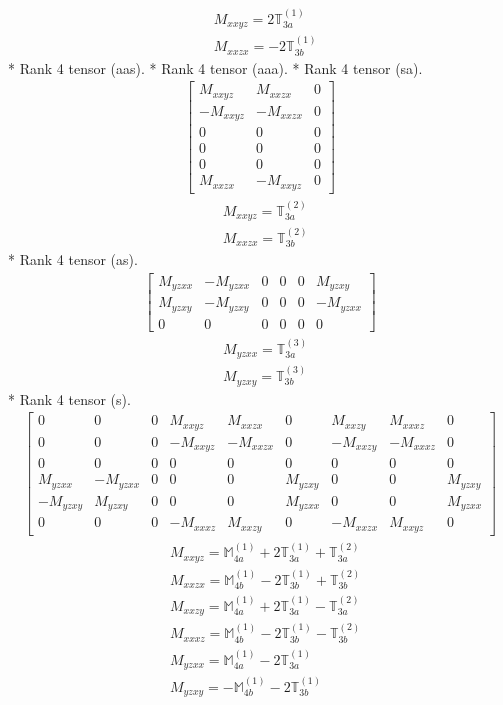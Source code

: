 \documentclass[fleqn,8pt,landscape]{jsarticle}
\begin{document}
\begin{align*}
& M_{xxyz} = 2 \mathbb{T}_{3a}^{(1)} \\
& M_{xxzx} = - 2 \mathbb{T}_{3b}^{(1)}
\end{align*}
* Rank 4 tensor (aas).
* Rank 4 tensor (aaa).
* Rank 4 tensor (sa).
\begin{align*}
\begin{bmatrix} M_{xxyz} & M_{xxzx} & 0 \\ - M_{xxyz} & - M_{xxzx} & 0 \\ 0 & 0 & 0 \\ 0 & 0 & 0 \\ 0 & 0 & 0 \\ M_{xxzx} & - M_{xxyz} & 0 \end{bmatrix}
\end{align*}
\begin{align*}
& M_{xxyz} = \mathbb{T}_{3a}^{(2)} \\
& M_{xxzx} = \mathbb{T}_{3b}^{(2)}
\end{align*}
* Rank 4 tensor (as).
\begin{align*}
\begin{bmatrix} M_{yzxx} & - M_{yzxx} & 0 & 0 & 0 & M_{yzxy} \\ M_{yzxy} & - M_{yzxy} & 0 & 0 & 0 & - M_{yzxx} \\ 0 & 0 & 0 & 0 & 0 & 0 \end{bmatrix}
\end{align*}
\begin{align*}
& M_{yzxx} = \mathbb{T}_{3a}^{(3)} \\
& M_{yzxy} = \mathbb{T}_{3b}^{(3)}
\end{align*}
* Rank 4 tensor (s).
\begin{align*}
\begin{bmatrix} 0 & 0 & 0 & M_{xxyz} & M_{xxzx} & 0 & M_{xxzy} & M_{xxxz} & 0 \\ 0 & 0 & 0 & - M_{xxyz} & - M_{xxzx} & 0 & - M_{xxzy} & - M_{xxxz} & 0 \\ 0 & 0 & 0 & 0 & 0 & 0 & 0 & 0 & 0 \\ M_{yzxx} & - M_{yzxx} & 0 & 0 & 0 & M_{yzxy} & 0 & 0 & M_{yzxy} \\ - M_{yzxy} & M_{yzxy} & 0 & 0 & 0 & M_{yzxx} & 0 & 0 & M_{yzxx} \\ 0 & 0 & 0 & - M_{xxxz} & M_{xxzy} & 0 & - M_{xxzx} & M_{xxyz} & 0 \end{bmatrix}
\end{align*}
\begin{align*}
& M_{xxyz} = \mathbb{M}_{4a}^{(1)} + 2 \mathbb{T}_{3a}^{(1)} + \mathbb{T}_{3a}^{(2)} \\
& M_{xxzx} = \mathbb{M}_{4b}^{(1)} - 2 \mathbb{T}_{3b}^{(1)} + \mathbb{T}_{3b}^{(2)} \\
& M_{xxzy} = \mathbb{M}_{4a}^{(1)} + 2 \mathbb{T}_{3a}^{(1)} - \mathbb{T}_{3a}^{(2)} \\
& M_{xxxz} = \mathbb{M}_{4b}^{(1)} - 2 \mathbb{T}_{3b}^{(1)} - \mathbb{T}_{3b}^{(2)} \\
& M_{yzxx} = \mathbb{M}_{4a}^{(1)} - 2 \mathbb{T}_{3a}^{(1)} \\
& M_{yzxy} = - \mathbb{M}_{4b}^{(1)} - 2 \mathbb{T}_{3b}^{(1)}
\end{align*}
\end{document}
